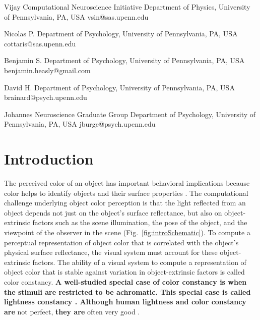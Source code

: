 \documentclass{jov}
\providecommand{\DIFaddtex}[1]{{\bf #1}} %
\providecommand{\DIFdeltex}[1]{} %
\providecommand{\DIFaddbegin}{} %
\providecommand{\DIFaddend}{} %
\providecommand{\DIFdelbegin}{} %
\providecommand{\DIFdelend}{} %
\providecommand{\DIFadd}[1]{\texorpdfstring{\DIFaddtex{#1}}{#1}} %
\providecommand{\DIFdel}[1]{\texorpdfstring{\DIFdeltex{#1}}{}} %
\newcommand{\DIFscaledelfig}{0.5}
\newlength{\DIFdelgraphicswidth} %
\newlength{\DIFdelgraphicsheight} %
\newcommand{\DIFaddincludegraphics}[2][]{{\color{blue}\fbox{\DIFOincludegraphics[#1]{#2}}}} %
\newcommand{\DIFdelincludegraphics}[2][]{%
\sbox{\DIFdelgraphicsbox}{\DIFOincludegraphics[#1]{#2}}%
\settoboxwidth{\DIFdelgraphicswidth}{\DIFdelgraphicsbox} %
\settoboxtotalheight{\DIFdelgraphicsheight}{\DIFdelgraphicsbox} %
\scalebox{\DIFscaledelfig}{%
\parbox[b]{\DIFdelgraphicswidth}{\usebox{\DIFdelgraphicsbox}\\[-\baselineskip] \rule{\DIFdelgraphicswidth}{0em}}\llap{\resizebox{\DIFdelgraphicswidth}{\DIFdelgraphicsheight}{%
\setlength{\unitlength}{\DIFdelgraphicswidth}%
\begin{picture}(1,1)%
\thicklines\linethickness{2pt} %
{\color[rgb]{1,0,0}\put(0,0){\framebox(1,1){}}}%
{\color[rgb]{1,0,0}\put(0,0){\line( 1,1){1}}}%
{\color[rgb]{1,0,0}\put(0,1){\line(1,-1){1}}}%
\end{picture}%
}\hspace*{3pt}}} %
} %
\DeclareRobustCommand{\DIFaddbegin}{\DIFOaddbegin \let\includegraphics\DIFaddincludegraphics} %
\DeclareRobustCommand{\DIFaddend}{\DIFOaddend \let\includegraphics\DIFOincludegraphics} %
\DeclareRobustCommand{\DIFdelbegin}{\DIFOdelbegin \let\includegraphics\DIFdelincludegraphics} %
\DeclareRobustCommand{\DIFdelend}{\DIFOaddend \let\includegraphics\DIFOincludegraphics} %
\begin{document}
\author{Singh}{Vijay}
 {Computational Neuroscience Initiative}
 {Department of Physics, University of Pennsylvania, PA, USA}
 {}{vsin@sas.upenn.edu}

 \author{Cottaris}{Nicolas P.}
 {}
 {Department of Psychology, University of Pennsylvania, PA, USA}
 {}{cottaris@sas.upenn.edu}

 \author{Heasly}{Benjamin S.}
 {}
 {Department of Psychology, University of Pennsylvania, PA, USA}
 {}{benjamin.heasly@gmail.com}

 \author{Brainard}{David H.}
 {}
 {Department of Psychology, University of Pennsylvania, PA, USA}
 {}{brainard@psych.upenn.edu}

 \author{Burge}{Johannes}
 {Neuroscience Graduate Group}
 {Department of Psychology, University of Pennsylvania, PA, USA}
 {}{jburge@psych.upenn.edu}



\maketitle

\section{Introduction}
The perceived color of an object has important behavioral implications because color helps to identify objects and their surface properties \cite{Mollon89, Jacobs81}.
The computational challenge underlying object color perception is that the light reflected from an object depends not just on the object's surface reflectance, but also 
on object-extrinsic factors such as the scene illumination, the pose of the object, and the viewpoint of the observer in the scene (Fig.~\ref{fig:introSchematic}).
To compute a perceptual representation of object color that is correlated with the object's physical surface reflectance, the visual system must account for these object-extrinsic factors.
The ability of a visual system to compute a representation of object color that is stable against variation in object-extrinsic factors is called color constancy. 
\DIFdelbegin \DIFdel{Although human color constancy is }\DIFdelend \DIFaddbegin \DIFadd{A well-studied special case of color constancy is when the stimuli are restricted to be achromatic. 
This special case is called lightness constancy \cite{gilchrist2006seeing}. 
Although human lightness and color constancy are }\DIFaddend not perfect, \DIFdelbegin \DIFdel{it is }\DIFdelend \DIFaddbegin \DIFadd{they are }\DIFaddend often very good \DIFdelbegin \DIFdel{\cite{FosterColorConstancy, BrainardColorConstancy}}\DIFdelend \DIFaddbegin \DIFadd{\cite{FosterColorConstancy, BrainardColorConstancy,adelson2000,kingdom2011lightness}}\DIFaddend . 
\end{document}

